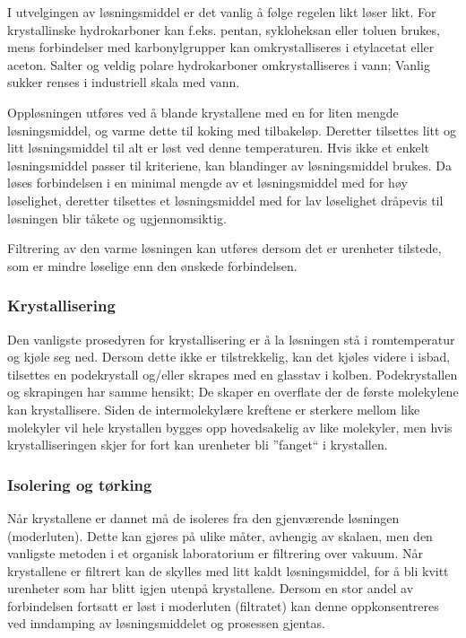 I utvelgingen av løsningsmiddel er det vanlig å følge regelen likt løser likt. For krystallinske hydrokarboner kan f.eks. pentan, sykloheksan eller toluen brukes, mens forbindelser med karbonylgrupper kan omkrystalliseres i etylacetat eller aceton\cite{harwood1999experimental}. Salter og veldig polare hydrokarboner omkrystalliseres i vann; Vanlig sukker renses i industriell skala med vann\cite{tro2011chemistry}.

Oppløsningen utføres ved å blande krystallene med en for liten mengde løsningsmiddel, og varme dette til koking med tilbakeløp. Deretter tilsettes litt og litt løsningsmiddel til alt er løst ved denne temperaturen. Hvis ikke et enkelt løsningsmiddel passer til kriteriene, kan blandinger av løsningsmiddel brukes\cite{harwood1999experimental}.  Da løses forbindelsen i en minimal mengde av et løsningsmiddel med for høy løselighet, deretter tilsettes et løsningsmiddel med for lav løselighet dråpevis til løsningen blir tåkete og ugjennomsiktig. 

Filtrering av den varme løsningen kan utføres dersom det er urenheter tilstede, som er mindre løselige enn den ønskede forbindelsen.


\subsubsection{Krystallisering}
Den vanligste prosedyren for krystallisering er å la løsningen stå i romtemperatur og kjøle seg ned\cite{harwood1999experimental}. Dersom dette ikke er tilstrekkelig, kan det kjøles videre i isbad, tilsettes en podekrystall og/eller skrapes med en glasstav i kolben. Podekrystallen og skrapingen har samme hensikt; De skaper en overflate der de første molekylene kan krystallisere. Siden de intermolekylære kreftene er sterkere mellom like molekyler vil hele krystallen bygges opp hovedsakelig av like molekyler, men hvis krystalliseringen skjer for fort kan urenheter bli ''fanget`` i krystallen. 

\subsubsection{Isolering og tørking}
Når krystallene er dannet må de isoleres fra den gjenværende løsningen (moderluten). Dette kan gjøres på ulike måter, avhengig av skalaen, men den vanligste metoden i et organisk laboratorium er filtrering over vakuum. Når krystallene er filtrert kan de skylles med litt kaldt løsningsmiddel, for å bli kvitt urenheter som har blitt igjen utenpå krystallene. Dersom en stor andel av forbindelsen fortsatt er løst i moderluten (filtratet) kan denne oppkonsentreres ved inndamping av løsningsmiddelet og prosessen gjentas.

